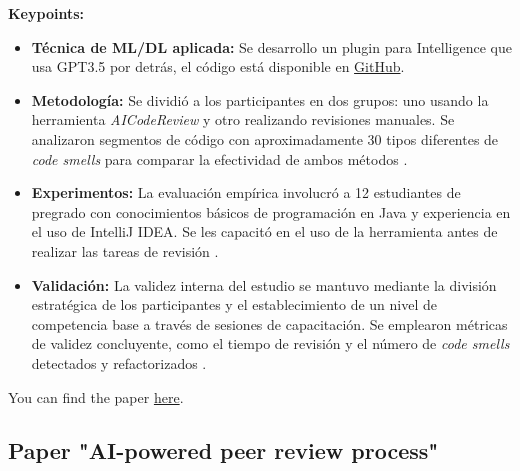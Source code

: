 \documentclass{article}
\begin{document}
\textbf{Keypoints:}

\begin{itemize}
    \item \textbf{Técnica de ML/DL aplicada:} Se desarrollo un plugin para Intelligence que usa GPT3.5 por detrás, el código está disponible en \href{https://github.com/ElsevierSoftwareX/SOFTX-D-23-00603}{GitHub}.
    
    \item \textbf{Metodología:} Se dividió a los participantes en dos grupos: uno usando la herramienta \textit{AICodeReview} y otro realizando revisiones manuales. Se analizaron segmentos de código con aproximadamente 30 tipos diferentes de \textit{code smells} para comparar la efectividad de ambos métodos \cite{ALMEIDA2024101677}.
    
    \item \textbf{Experimentos:} La evaluación empírica involucró a 12 estudiantes de pregrado con conocimientos básicos de programación en Java y experiencia en el uso de IntelliJ IDEA. Se les capacitó en el uso de la herramienta antes de realizar las tareas de revisión \cite{ALMEIDA2024101677}.
    
    \item \textbf{Validación:} La validez interna del estudio se mantuvo mediante la división estratégica de los participantes y el establecimiento de un nivel de competencia base a través de sesiones de capacitación. Se emplearon métricas de validez concluyente, como el tiempo de revisión y el número de \textit{code smells} detectados y refactorizados \cite{ALMEIDA2024101677}.
\end{itemize}

You can find the paper \href{https://www.sciencedirect.com/science/article/pii/S2352711024000487}{here}.

\subsection{Paper "AI-powered peer review process" \cite{Oliveira_Rios_Jiang_2023}}
\end{document}
